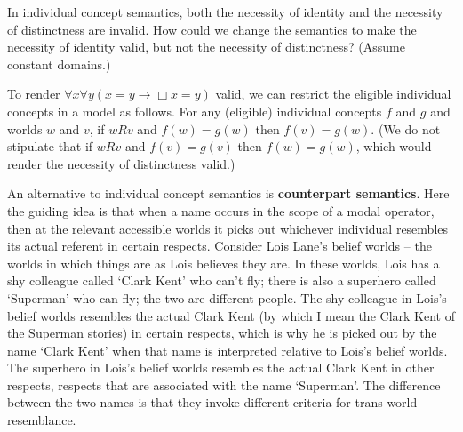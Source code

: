 \begin{exercise}
  In individual concept semantics, both the necessity of identity and the
  necessity of distinctness are invalid. How could we change the semantics to
  make the necessity of identity valid, but not the necessity of distinctness?
  (Assume constant domains.)
\end{exercise}
\begin{solution}
  To render $\forall x \forall y (x\!=\!y \to \Box x\!=\!y)$ valid, we can
  restrict the eligible individual concepts in a model as follows. For any
  (eligible) individual concepts $f$ and $g$ and worlds $w$ and $v$, if $wRv$
  and $f(w)=g(w)$ then $f(v)=g(w)$. (We do not stipulate that if $wRv$ and
  $f(v)=g(v)$ then $f(w)=g(w)$, which would render the necessity of distinctness
  valid.)
\end{solution}

\iffalse

An alternative to individual concept semantics is \textbf{counterpart
  semantics}. Here the guiding idea is that when a name occurs in the scope of a
modal operator, then at the relevant accessible worlds it picks out whichever
individual resembles its actual referent in certain respects. Consider Lois
Lane's belief worlds -- the worlds in which things are as Lois believes they
are. In these worlds, Lois has a shy colleague called `Clark Kent' who can't
fly; there is also a superhero called `Superman' who can fly; the two are
different people. The shy colleague in Lois's belief worlds resembles the actual
Clark Kent (by which I mean the Clark Kent of the Superman stories) in certain
respects, which is why he is picked out by the name `Clark Kent' when that name
is interpreted relative to Lois's belief worlds. The superhero in Lois's belief
worlds resembles the actual Clark Kent in other respects, respects that are
associated with the name `Superman'. The difference between the two names is
that they invoke different criteria for trans-world resemblance.


